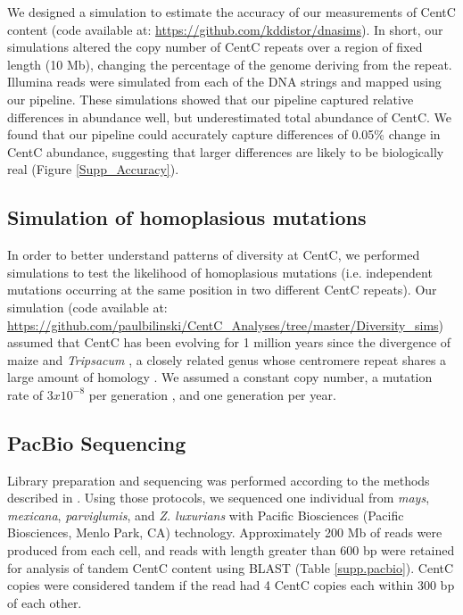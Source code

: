 We designed a simulation to estimate the accuracy of our measurements of CentC content (code available at: \url{https://github.com/kddistor/dnasims}).  
In short, our simulations altered the copy number of CentC repeats over a region of fixed length (10 Mb), changing the percentage of the genome deriving from the repeat.  
Illumina reads were simulated from each of the DNA strings and mapped using our pipeline.  These simulations showed that our pipeline captured relative differences in abundance well, but underestimated total abundance of CentC.  
We found that our pipeline could accurately capture differences of 0.05\% change in CentC abundance, suggesting that larger differences are likely to be biologically real (Figure \ref{Supp_Accuracy}).  

\subsection*{Simulation of homoplasious mutations}

In order to better understand patterns of diversity at CentC, we performed simulations to test the likelihood of homoplasious mutations (i.e. independent mutations occurring at the same position in two different CentC repeats). 
Our simulation (code available at: \url{https://github.com/paulbilinski/CentC_Analyses/tree/master/Diversity_sims}) assumed that CentC has been evolving for 1 million years since the divergence of maize and \emph{Tripsacum} \citep{Ross-Ibarra2009}, a closely related genus whose centromere repeat shares a large amount of homology \citep{Melters2012}.  
We assumed a constant copy number, a mutation rate of $3 x 10^{-8}$ per generation \citep{clark2005estimating}, and one generation per year.  

\subsection*{PacBio Sequencing}
	
Library preparation and sequencing was performed according to the methods described in \citep{Melters2012}.  
Using those protocols, we sequenced one individual from \emph{mays}, \emph{mexicana}, \emph{parviglumis}, and \emph{Z. luxurians} with Pacific Biosciences (Pacific Biosciences, Menlo Park, CA) technology. 
Approximately 200 Mb of reads were produced from each cell, and reads with length greater than 600 bp were retained for analysis of tandem CentC content using BLAST (Table \ref{supp.pacbio}).  
CentC copies were considered tandem if the read had 4 CentC copies each within 300 bp of each other. 

